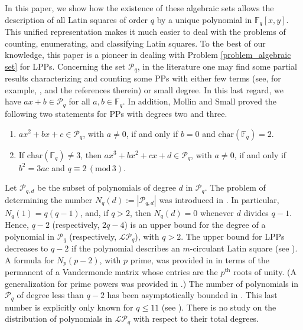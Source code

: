 \documentclass[pdflatex,sn-mathphys-num]{sn-jnl}
\theoremstyle{thmstyleone}%
\begin{document}
In this paper, we show how the existence of these algebraic sets allows the description of all Latin squares of order $q$ by a unique polynomial in $\mathbb{F}_q[x,y]$. This unified representation makes it much easier to deal with the problems of counting, enumerating, and classifying Latin squares. To the best of our knowledge, this paper is a pioneer in dealing with Problem \ref{problem_algebraic set} for LPPs. Concerning the set $\mathcal{P}_q$, in the literature one may find some partial results characterizing and counting some PPs with either few terms (see, for example, \cite{Hou2015a, Jarali2023, Tu2019, Ozbudak2023, Zhang2023}, and the references therein) or small degree. In this last regard, we have $ax+b\in\mathcal{P}_q$ for all $a,b\in\mathbb{F}_q$. In addition, Mollin and Small \cite{Mollin1987} proved the following two statements for PPs with degrees two and three.
\begin{enumerate}
    \item[(D2)] $ax^2+bx+c\in\mathcal{P}_q$, with $a\neq 0$, if and only if $b=0$ and $\mathrm{char}(\mathbb{F}_q)=2$.

    \item[(D3)] If $\mathrm{char}(\mathbb{F}_q)\neq 3$, then $ax^3+bx^2+cx+d\in\mathcal{P}_q$, with $a\neq 0$, if and only if $b^2=3ac$ and $q\equiv 2\, (\mathrm{mod}\, 3)$.
\end{enumerate}
Let $\mathcal{P}_{q,d}$ be the subset of polynomials of degree $d$ in $\mathcal{P}_q$. The problem of determining the number $N_q(d):=|\mathcal{P}_{q,d}|$ was introduced in \cite{Lidl1988}. In particular, $N_q(1)=q(q-1)$, and, if $q>2$, then $N_q(d)=0$ whenever $d$ divides $q-1$. Hence, $q-2$ (respectively, $2q-4$) is an upper bound for the degree of a polynomial in $\mathcal{P}_q$ (respectively, $\mathcal{LP}_q$), with $q>2$. The upper bound for LPPs decreases to $q-2$ if the polynomial describes an $m$-circulant Latin square (see \cite{Diestelkamp2004}). A formula for $N_p(p-2)$, with $p$ prime, was provided in \cite{Das2002} in terms of the permanent of a Vandermonde matrix whose entries are the $p^{\mathrm{th}}$ roots of unity. (A generalization for prime powers was provided in \cite{Kim2016}.) The number of polynomials in $\mathcal{P}_q$ of degree less than $q-2$ has been asymptotically bounded in \cite{Konyagin2002, Das2002, Kim2016}. This last number is explicitly only known for $q\leq 11$ (see \cite{Konyagin2002}). There is no study on the distribution of polynomials in $\mathcal{LP}_q$ with respect to their total degrees.
\end{document}
